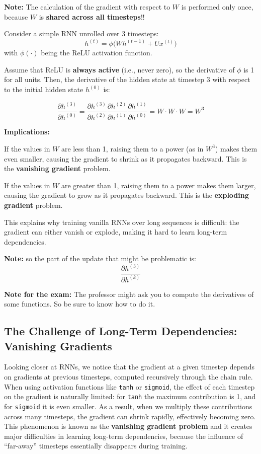 \textbf{Note:} The calculation of the gradient with respect to $W$ is performed only once, because $W$ is \textbf{shared across all timesteps}!!
\begin{infobox}
    Consider a simple RNN unrolled over 3 timesteps:
    \[
    h^{(t)} = \phi\big(W h^{(t-1)} + U x^{(t)}\big)
    \]
    with $\phi(\cdot)$ being the ReLU activation function.  
    
    Assume that ReLU is \textbf{always active} (i.e., never zero), so the derivative of $\phi$ is 1 for all units. Then, the derivative of the hidden state at timestep 3 with respect to the initial hidden state $h^{(0)}$ is:
    
    \[
    \frac{\partial h^{(3)}}{\partial h^{(0)}} 
    = \frac{\partial h^{(3)}}{\partial h^{(2)}} \frac{\partial h^{(2)}}{\partial h^{(1)}} \frac{\partial h^{(1)}}{\partial h^{(0)}} = W \cdot W \cdot W = W^3
    \]
    
    \textbf{Implications:}
    
    \begin{compactitemize}
        \item If the values in $W$ are less than 1, raising them to a power (as in $W^3$) makes them even smaller, causing the gradient to shrink as it propagates backward. This is the \textbf{vanishing gradient} problem.
        \item If the values in $W$ are greater than 1, raising them to a power makes them larger, causing the gradient to grow as it propagates backward. This is the \textbf{exploding gradient} problem.
        \item This explains why training vanilla RNNs over long sequences is difficult: the gradient can either vanish or explode, making it hard to learn long-term dependencies.
    \end{compactitemize}
    
    \textbf{Note:} so the part of the update that might be problematic is:
    \[
    \frac{\partial h^{(3)}}{\partial h^{(k)}}
    \]

    \textbf{Note for the exam:} The professor might ask you to compute the derivatives of some functions. So be sure to know how to do it.
\end{infobox}

\subsection{The Challenge of Long-Term Dependencies: Vanishing Gradients}
Looking closer at RNNs, we notice that the gradient at a given timestep depends on gradients at previous timesteps, computed recursively through the chain rule. When using activation functions like \texttt{tanh} or \texttt{sigmoid}, the effect of each timestep on the gradient is naturally limited: for \texttt{tanh} the maximum contribution is 1, and for \texttt{sigmoid} it is even smaller. As a result, when we multiply these contributions across many timesteps, the gradient can shrink rapidly, effectively becoming zero. This phenomenon is known as the \textbf{vanishing gradient problem} and it creates major difficulties in learning long-term dependencies, because the influence of “far-away” timesteps essentially disappears during training.
